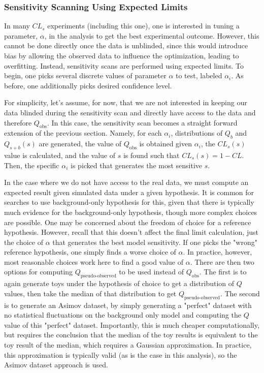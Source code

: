\subsubsection{Sensitivity Scanning Using Expected Limits}
\label{subsubsec:sensitivity_scanning_limits}

In many $CL_s$ experiments (including this one), one is interested in tuning a parameter, $\alpha$, in the analysis to get the best experimental outcome. However, this cannot be done directly once the data is unblinded, since this would introduce bias by allowing the observed data to influence the optimization, leading to overfitting. Instead, sensitivity scans are performed using expected limits. To begin, one picks several discrete values of parameter $\alpha$ to test, labeled $\alpha_i$. As before, one additionally picks desired confidence level.

For simplicity, let's assume, for now, that we are not interested in keeping our data blinded during the sensitivity scan and directly have access to the data and therefore $Q_{\text{obs}}$. In this case, the sensitivity scan becomes a straight forward extension of the previous section. Namely, for each $\alpha_i$, distributions of $Q_b$ and $Q_{s+b}(s)$ are generated, the value of $Q_{\text{obs}}$ is obtained given $\alpha_i$, the $CL_s(s)$ value is calculated, and the value of $s$ is found such that $CL_s(s) = 1-CL$. Then, the specific $\alpha_i$ is picked that generates the most sensitive $s$. 

In the case where we do not have access to the real data, we must compute an expected result given simulated data under a given hypothesis. It is common for searches to use background-only hypothesis for this, given that there is typically much evidence for the background-only hypothesis, though more complex choices are possible. One may be concerned about the freedom of choice for a reference hypothesis. However, recall that this doesn't affect the final limit calculation, just the choice of $\alpha$ that generates the best model sensitivity. If one picks the "wrong" reference hypothesis, one simply finds a worse choice of $\alpha$. In practice, however, most reasonable choices work here to find a good value of $\alpha$. There are then two options for computing $Q_{\text{pseudo-observed}}$ to be used instead of $Q_{\text{obs}}$. The first is to again generate toys under the hypothesis of choice to get a distribution of $Q$ values, then take the median of that distribution to get $Q_{\text{pseudo-observed}}$. The second is to generate an Asimov dataset, by simply generating a "perfect" dataset with no statistical fluctuations on the background only model and computing the $Q$ value of this "perfect" dataset. Importantly, this is much cheaper computationally, but requires the conclusion that the median of the toy results is equivalent to the toy result of the median, which requires a Gaussian approximation. In practice, this approximation is typically valid (as is the case in this analysis), so the Asimov dataset approach is used.


